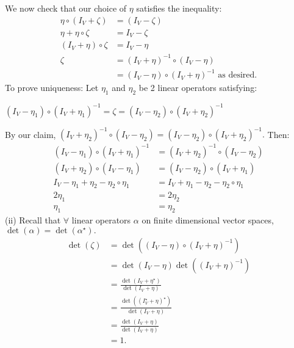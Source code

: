\documentclass{article}
\begin{document}
We now check that our choice of $\eta$ satisfies the inequality:
\begin{align*}
\eta\circ(I_V + \zeta) &= (I_V-\zeta)\\
\eta + \eta\circ\zeta &= I_V - \zeta\\
(I_V + \eta)\circ\zeta &= I_V - \eta\\
\zeta &= (I_V+\eta)^{-1}\circ(I_V-\eta)\\
&= (I_V-\eta)\circ(I_V+\eta)^{-1} \text{ as desired.}
\end{align*}
To prove uniqueness: Let $\eta_1$ and $\eta_2$ be 2 linear operators satisfying:\begin{center}
    $(I_V -\eta_1)\circ(I_V+\eta_1)^{-1} = \zeta = (I_V-\eta_2)\circ(I_V + \eta_2)^{-1}$
\end{center}
By our claim, $(I_V+\eta_2)^{-1}\circ(I_V-\eta_2)=(I_V-\eta_2)\circ(I_V+\eta_2)^{-1}.$ Then:\begin{align*}
    (I_V-\eta_1)\circ(I_V+\eta_1)^{-1} &= (I_V+\eta_2)^{-1}\circ(I_V-\eta_2)\\
    (I_V+\eta_2)\circ(I_V-\eta_1) &= (I_V-\eta_2)\circ(I_V+\eta_1)\\
    I_V - \eta_1 + \eta_2 - \eta_2\circ\eta_1 &= I_V +\eta_1 - \eta_2 - \eta_2\circ\eta_1\\
    2\eta_1 &= 2\eta_2\\
    \eta_1 &= \eta_2
\end{align*}
(ii) Recall that $\forall $ linear operators $\alpha $ on finite dimensional vector spaces,\\$\det(\alpha) = \det(\alpha^\star).$\begin{align*}
\det(\zeta) &= \det((I_V - \eta)\circ(I_V+\eta)^{-1})\\
&= \det(I_V-\eta)\det((I_V+\eta)^{-1})\\
&= \frac{\det(I_V + \eta^{\star})}{\det(I_V+\eta)}\\
&= \frac{\det((I_V^\star + \eta)^\star)}{\det(I_V+\eta)}\\
&= \frac{\det(I_V+\eta)}{\det(I_V+\eta)}\\
&= 1.
\end{align*}
\end{document}
